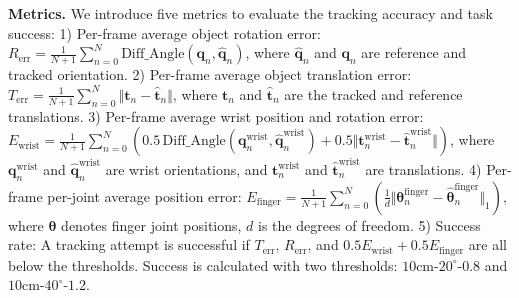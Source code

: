 \vspace{-5pt}
\noindent\textbf{Metrics.} 
We introduce five metrics to evaluate the tracking accuracy and task success: 1) Per-frame average object rotation error: \( R_{\text{err}} = \frac{1}{N+1} \sum_{n=0}^N \text{Diff\_Angle}(\mathbf{q}_n, \hat{\mathbf{q}}_n) \), where \( \hat{\mathbf{q}}_n \) and  \( \mathbf{q}_n \)  are reference and tracked orientation.
2) Per-frame average object translation error: \( T_{\text{err}} = \frac{1}{N+1} \sum_{n=0}^N \Vert \mathbf{t}_n - \hat{\mathbf{t}}_n \Vert \), where \( \mathbf{t}_n \) and \( \hat{\mathbf{t}}_n \) are the tracked and reference translations. 3) Per-frame average wrist position and rotation error: \( E_{\text{wrist}} = \frac{1}{N+1} \sum_{n=0}^N \left( 0.5 \, \text{Diff\_Angle}(\mathbf{q}_n^{\text{wrist}}, \hat{\mathbf{q}}_n^{\text{wrist}}) + 0.5 \Vert \mathbf{t}_n^{\text{wrist}} - \hat{\mathbf{t}}_n^{\text{wrist}} \Vert \right) \), where \( \mathbf{q}_n^{\text{wrist}} \) and \( \hat{\mathbf{q}}_n^{\text{wrist}} \) are wrist orientations, and \( \mathbf{t}_n^{\text{wrist}} \) and \( \hat{\mathbf{t}}_n^{\text{wrist}} \) are translations. 4) Per-frame per-joint average position error: \( E_{\text{finger}} = \frac{1}{N+1} \sum_{n=0}^N \left( \frac{1}{d} \Vert \mathbf{\theta}_n^{\text{finger}} - \hat{\mathbf{\theta}}_n^{\text{finger}} \Vert_1 \right) \), where $\mathbf{\theta}$ denotes finger joint positions, \( d \) is the degrees of freedom.
5) Success rate: A tracking attempt is successful if \( T_{\text{err}} \), \( R_{\text{err}} \), and \( 0.5E_{\text{wrist}} + 0.5E_{\text{finger}} \) are all below the thresholds. Success is calculated with two thresholds: \( 10\text{cm} \)-\(20^\circ\)-\(0.8\) and \( 10\text{cm} \)-\(40^\circ\)-\(1.2\).
